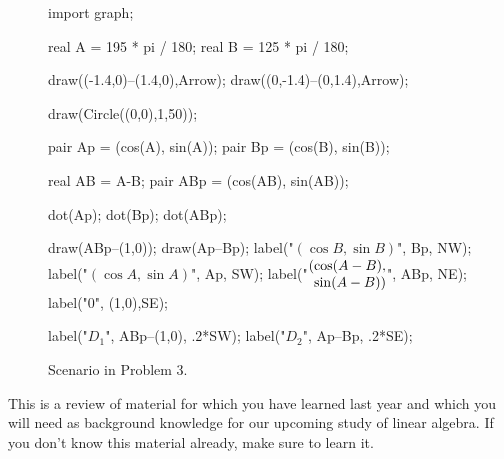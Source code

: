 \documentclass[../gatm.tex]{subfiles}
\begin{document}
\begin{figure}[h]
	\begin{center}
		\begin{minipage}[b]{\textwidth}
			\centering
			\begin{asy}[width=0.5\textwidth]
				import graph;
				
				real A = 195 * pi / 180;
				real B = 125 * pi / 180;
				
				draw((-1.4,0)--(1.4,0),Arrow);
				draw((0,-1.4)--(0,1.4),Arrow);
				
				draw(Circle((0,0),1,50));
				
				pair Ap = (cos(A), sin(A));
				pair Bp = (cos(B), sin(B));
				
				real AB = A-B;
				pair ABp = (cos(AB), sin(AB));
				
				dot(Ap);
				dot(Bp);
				dot(ABp);
				
				draw(ABp--(1,0));
				draw(Ap--Bp);
				label("$(\cos B, \sin B)$", Bp, NW);
				label("$(\cos A, \sin A)$", Ap, SW);
				label("$\arraycolsep=0pt \begin{array}{rl} (& \cos (A-B), \\ & \sin (A-B)) \end{array}$", ABp, NE);
				label("$0$", (1,0),SE);
				
				label("$D_1$", ABp--(1,0), .2*SW);
				label("$D_2$", Ap--Bp, .2*SE);
				
			\end{asy}
		\end{minipage}
	\end{center}
	\vspace*{-2\baselineskip}
	\begin{center}
		\begin{minipage}[t]{\textwidth}
			\caption{Scenario in Problem 3.}
			\label{fig:unit_circle}
		\end{minipage}\hfill
	\end{center}
\end{figure}

\noindent This is a review of material for which you have learned last year and which you will need as background knowledge for our upcoming study of linear algebra. If you don't know this material already, make sure to learn it.
\end{document}
